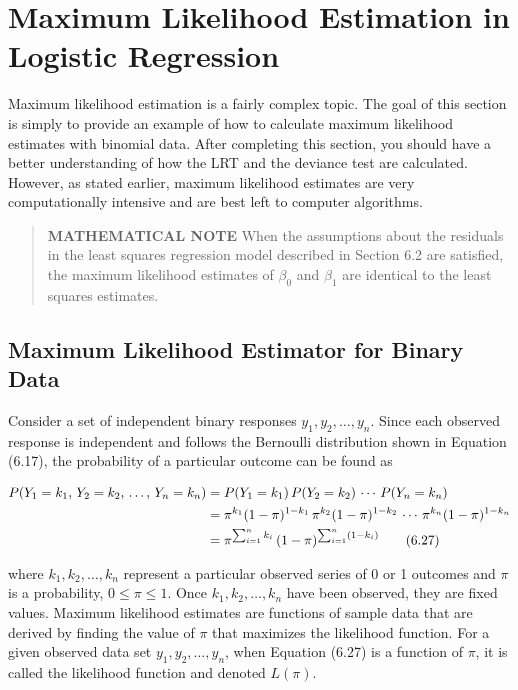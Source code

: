 \documentclass[
]{book}
\begin{document}
\hypertarget{maximum-likelihood-estimation-in-logistic-regression}{%
\section{Maximum Likelihood Estimation in Logistic Regression}\label{maximum-likelihood-estimation-in-logistic-regression}}

Maximum likelihood estimation is a fairly complex topic. The goal of this section is simply to provide an example of how to calculate maximum likelihood estimates with binomial data. After completing this section, you should have a better understanding of how the LRT and the deviance test are calculated. However, as stated earlier, maximum likelihood estimates are very computationally intensive and are best left to computer algorithms.

\begin{quote}
\textbf{MATHEMATICAL NOTE} When the assumptions about the residuals in the least squares regression model described in Section 6.2 are satisfied, the maximum likelihood estimates of \(\beta_0\) and \(\beta_1\) are identical to the least squares estimates.
\end{quote}

\hypertarget{maximum-likelihood-estimator-for-binary-data}{%
\subsection*{Maximum Likelihood Estimator for Binary Data}\label{maximum-likelihood-estimator-for-binary-data}}

Consider a set of independent binary responses \(y_1, y_2, \dots, y_n\). Since each observed response is independent and follows the Bernoulli distribution shown in Equation (6.17), the probability of a particular outcome can be found as

\begin{align}
P(Y_1 = k_1,\,Y_2 = k_2,\,\dots,\,Y_n = k_n) 
&= P(Y_1 = k_1)\,P(Y_2 = k_2)\,\cdots\,P(Y_n = k_n) \notag \\
&= \pi^{k_1}(1 - \pi)^{1-k_1}\,\pi^{k_2}(1 - \pi)^{1-k_2}\,\cdots\,\pi^{k_n}(1 - \pi)^{1-k_n} \notag \\
&= \pi^{\sum_{i=1}^n k_i}\,(1 - \pi)^{\sum_{i=1}^n (1 - k_i)}
\tag{6.27}
\end{align}

where \(k_1, k_2, \dots, k_n\) represent a particular observed series of 0 or 1 outcomes and \(\pi\) is a probability, \(0 \le \pi \le 1\). Once \(k_1, k_2, \dots, k_n\) have been observed, they are fixed values. Maximum likelihood estimates are functions of sample data that are derived by finding the value of \(\pi\) that maximizes the likelihood function. For a given observed data set \(y_1, y_2, \dots, y_n\), when Equation (6.27) is a function of \(\pi\), it is called the likelihood function and denoted \(L(\pi)\).
\end{document}
